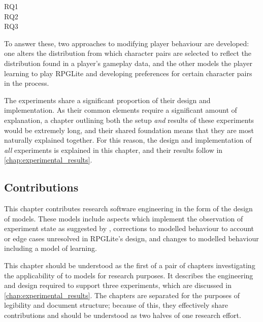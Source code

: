\begin{researchquestion}
  \begin{description}
   \item[RQ1] \rqone{}
   \item[RQ2] \rqtwo{}
   \item[RQ3] \rqthree{}
  \end{description}
\end{researchquestion}

To answer these, two approaches to modifying player behaviour are developed:
one alters the distribution from which character pairs are selected to reflect
the distribution found in a player's gameplay data, 
and the other models the player learning to play RPGLite and developing
preferences for certain character pairs in the process.

The experiments share a significant proportion of their design and
implementation. As their common elements require a significant amount of
explanation, a chapter outlining both the setup \emph{and} results of these
experiments would be extremely long, and their shared foundation means that they
are most naturally explained together. For this reason, the design and
implementation of \emph{all} experiments is explained in this chapter, and their
results follow in \cref{chap:experimental_results}.

\subsection{Contributions}

This chapter contributes research software engineering in the form of the design
of \aspectoriented models. These models include aspects which implement the
observation of experiment state as suggested by \citep{gulyas1999use},
corrections to modelled behaviour to account or edge cases unresolved in
RPGLite's design, and changes to modelled behaviour including a model of
learning.

This chapter should be understood as the first of a pair of chapters
investigating the applicability of \aop to models for
research purposes. It describes the engineering and design required to support
three experiments, which are discussed in \cref{chap:experimental_results}. The
chapters are separated for the purposes of legibility and document structure;
because of this, they effectively share contributions and should be understood
as two halves of one research effort.




